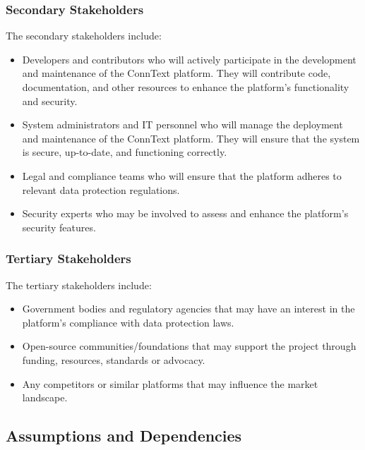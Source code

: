 \documentclass{article}
\begin{document}
\subsubsection{Secondary Stakeholders}
The secondary stakeholders include:
\begin{itemize}
    \item Developers and contributors who will actively participate in the development and maintenance of the ConnText platform. They will contribute code, documentation, and other resources to enhance the platform's functionality and security.
    \item System administrators and IT personnel who will manage the deployment and maintenance of the ConnText platform. They will ensure that the system is secure, up-to-date, and functioning correctly.
    \item Legal and compliance teams who will ensure that the platform adheres to relevant data protection regulations.
    \item Security experts who may be involved to assess and enhance the platform's security features.
\end{itemize}

\subsubsection{Tertiary Stakeholders}
The tertiary stakeholders include:
\begin{itemize}
    \item Government bodies and regulatory agencies that may have an interest in the platform's compliance with data protection laws.
    \item Open-source communities/foundations that may support the project through funding, resources, standards or advocacy.
    \item Any competitors or similar platforms that may influence the market landscape.
\end{itemize} 


\subsection{Assumptions and Dependencies}
\end{document}
